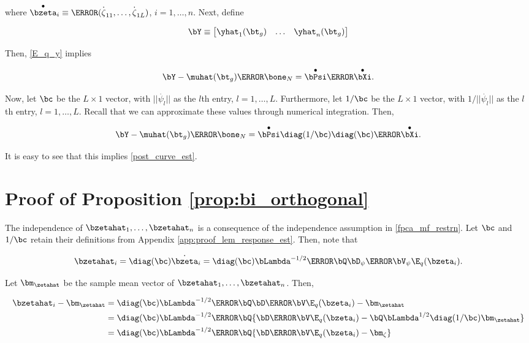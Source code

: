 \documentclass[12pt]{article}
\theoremstyle{plain}
\theoremstyle{definition}
\theoremstyle{remark}
\begin{document}
\noindent where $\overset{\bullet}{\bzeta}_i \equiv \T{(\overset{\textbf{.}}{\zeta}_{11}, \dots, \overset{\textbf{.}}{\zeta}_{1L})}$,
$i = 1, \dots, n$. Next, define

\[
	\bY \equiv \begin{bmatrix} \yhat_1 (\bt_g) & \dots & \yhat_n (\bt_g) \end{bmatrix}
\]

\noindent Then, \eqref{E_q_y} implies

\[
	\bY - \muhat (\bt_g) \T{\bone_N} = \overset{\bullet}{\bPsi} \T{\overset{\bullet}{\bXi}}.
\]

\noindent Now, let $\bc$ be the $L \times 1$ vector, with $|| \overset{\textbf{.}}{\psi}_l ||$ as the $l$th entry, $l = 1, \dots, L$.
Furthermore, let $1/\bc$ be the $L \times 1$ vector, with $1/|| \overset{\textbf{.}}{\psi}_l ||$ as the $l$th entry, $l = 1, \dots, L$.
Recall that we can approximate these values through numerical integration. Then,

\[
	\bY - \muhat (\bt_g) \T{\bone_N} = \overset{\bullet}{\bPsi} \diag (1/\bc) \diag (\bc) \T{\overset{\bullet}{\bXi}}.
\]

\noindent It is easy to see that this implies \eqref{post_curve_est}.


\section{Proof of Proposition \ref{prop:bi_orthogonal}}
\label{app:proof_prop_bi_eigenfunctions}

The independence of $\bzetahat_1, \dots, \bzetahat_n$ is a consequence of the independence assumption in
\eqref{fpca_mf_restrn}. Let $\bc$ and $1/\bc$ retain their definitions from Appendix
\ref{app:proof_lem_response_est}. Then, note that

\[
	\bzetahat_i
		= \diag (\bc) \overset{\textbf{.}}{\bzeta}_i
		= \diag (\bc) \bLambda^{-1/2} \T{\bQ} \bD_\psi \T{\bV_\psi} \E_q (\bzeta_i).
\]

\noindent Let $\bm_\zetahat$ be the sample mean vector of $\bzetahat_1, \dots, \bzetahat_n$. Then,

\begin{align*}
	\bzetahat_i - \bm_\zetahat
		&= \diag (\bc) \bLambda^{-1/2} \T{\bQ} \bD \T{\bV} \E_q (\bzeta_i) - \bm_\zetahat \\
		&= \diag (\bc) \bLambda^{-1/2} \T{\bQ} \{ \bD \T{\bV} \E_q (\bzeta_i) - \bQ \bLambda^{1/2} \diag (1/\bc) \bm_\zetahat \} \\
		&= \diag (\bc) \bLambda^{-1/2} \T{\bQ} \{ \bD \T{\bV} \E_q (\bzeta_i) - \bm_\zeta \}
\end{align*}
\end{document}
